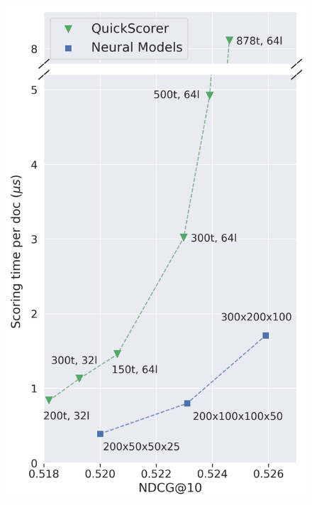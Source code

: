 \begin{figure}[t]
\begin{minipage}[b]{0.5\columnwidth}
\includegraphics[width=\columnwidth]{imgs/msn30k_final_stretched_broken.png}
\caption*{\footnotesize{\msn}}
\end{minipage}%
\begin{minipage}[b]{0.517\columnwidth}

\end{minipage}
\end{figure}
